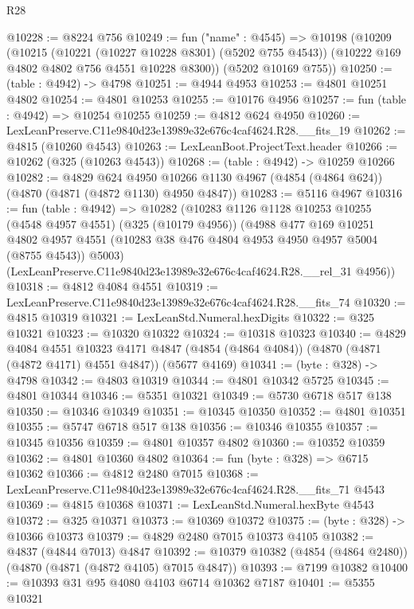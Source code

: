 \begin{lexlean}{R28}
\begin{coremodule}
@10228 := @8224 @756
@10249 := fun ("name" : @4545) =>
  @10198
    (@10209
      (@10215
        (@10221 (@10227 @10228 @8301) (@5202 @755 @4543))
        (@10222 @169 @4802 @4802 @756 @4551 @10228 @8300))
      (@5202 @10169 @755))
@10250 := (table : @4942) -> @4798
@10251 := @4944 @4953
@10253 := @4801 @10251 @4802
@10254 := @4801 @10253
@10255 := @10176 @4956
@10257 := fun (table : @4942) => @10254 @10255
@10259 := @4812 @624 @4950
@10260 := LexLeanPreserve.C11e9840d23e13989e32e676c4caf4624.R28.__fits_19
@10262 := @4815 (@10260 @4543)
@10263 := LexLeanBoot.ProjectText.header
@10266 := @10262 (@325 (@10263 @4543))
@10268 := (table : @4942) -> @10259 @10266
@10282 := @4829
    @624
    @4950
    @10266
    @1130
    @4967
    (@4854 (@4864 @624))
    (@4870 (@4871 (@4872 @1130) @4950 @4847))
@10283 := @5116 @4967
@10316 := fun (table : @4942) =>
  @10282
    (@10283
      @1126
      @1128
      @10253
      @10255
      (@4548 @4957 @4551)
      (@325 (@10179 @4956))
      (@4988
        @477
        @169
        @10251
        @4802
        @4957
        @4551
        (@10283 @38 @476 @4804 @4953 @4950 @4957 @5004 (@8755 @4543))
        @5003)
      (LexLeanPreserve.C11e9840d23e13989e32e676c4caf4624.R28.__rel_31 @4956))
@10318 := @4812 @4084 @4551
@10319 := LexLeanPreserve.C11e9840d23e13989e32e676c4caf4624.R28.__fits_74
@10320 := @4815 @10319
@10321 := LexLeanStd.Numeral.hexDigits
@10322 := @325 @10321
@10323 := @10320 @10322
@10324 := @10318 @10323
@10340 := @4829
    @4084
    @4551
    @10323
    @4171
    @4847
    (@4854 (@4864 @4084))
    (@4870 (@4871 (@4872 @4171) @4551 @4847))
    (@5677 @4169)
@10341 := (byte : @328) -> @4798
@10342 := @4803 @10319
@10344 := @4801 @10342 @5725
@10345 := @4801 @10344
@10346 := @5351 @10321
@10349 := @5730 @6718 @517 @138
@10350 := @10346 @10349
@10351 := @10345 @10350
@10352 := @4801 @10351
@10355 := @5747 @6718 @517 @138
@10356 := @10346 @10355
@10357 := @10345 @10356
@10359 := @4801 @10357 @4802
@10360 := @10352 @10359
@10362 := @4801 @10360 @4802
@10364 := fun (byte : @328) => @6715 @10362
@10366 := @4812 @2480 @7015
@10368 := LexLeanPreserve.C11e9840d23e13989e32e676c4caf4624.R28.__fits_71 @4543
@10369 := @4815 @10368
@10371 := LexLeanStd.Numeral.hexByte @4543
@10372 := @325 @10371
@10373 := @10369 @10372
@10375 := (byte : @328) -> @10366 @10373
@10379 := @4829 @2480 @7015 @10373 @4105
@10382 := @4837 (@4844 @7013) @4847
@10392 := @10379 @10382 (@4854 (@4864 @2480)) (@4870 (@4871 (@4872 @4105) @7015 @4847))
@10393 := @7199 @10382
@10400 := @10393 @31 @95 @4080 @4103 @6714 @10362 @7187
@10401 := @5355 @10321

\end{coremodule}
\end{lexlean}
